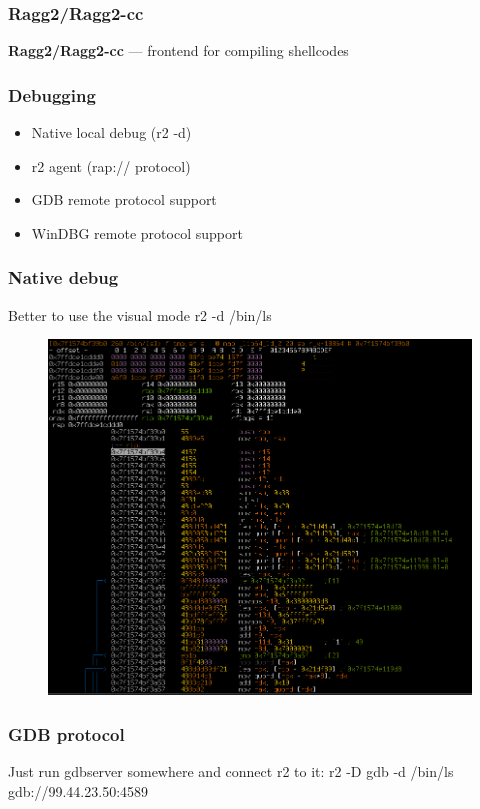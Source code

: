 \documentclass[10pt, compress]{beamer}
\begin{document}
\begin{frame}[fragile]
  \frametitle{Ragg2/Ragg2-cc}
  \center\textbf{Ragg2/Ragg2-cc} — frontend for compiling shellcodes
  \noindent\makebox[\linewidth]{\rule{\paperwidth}{0.4pt}}
\end{frame}

\begin{frame}[fragile]
  \frametitle{Debugging}
  \begin{itemize}
	\item Native local debug (r2 -d)
	\item r2 agent (rap:// protocol)
	\item GDB remote protocol support
	\item WinDBG remote protocol support
  \end{itemize}
\end{frame}

\begin{frame}[fragile]
  \frametitle{Native debug}
  \center Better to use the visual mode
  \center r2 -d /bin/ls
  \begin{figure}
  \includegraphics[width=\textwidth]{r2-nativedebug.png}
  \end{figure}
\end{frame}

\begin{frame}[fragile]
  \frametitle{GDB protocol}
  \center Just run gdbserver somewhere
  \center and connect r2 to it:
  \center r2 -D gdb -d /bin/ls gdb://99.44.23.50:4589
\end{frame}
\end{document}
